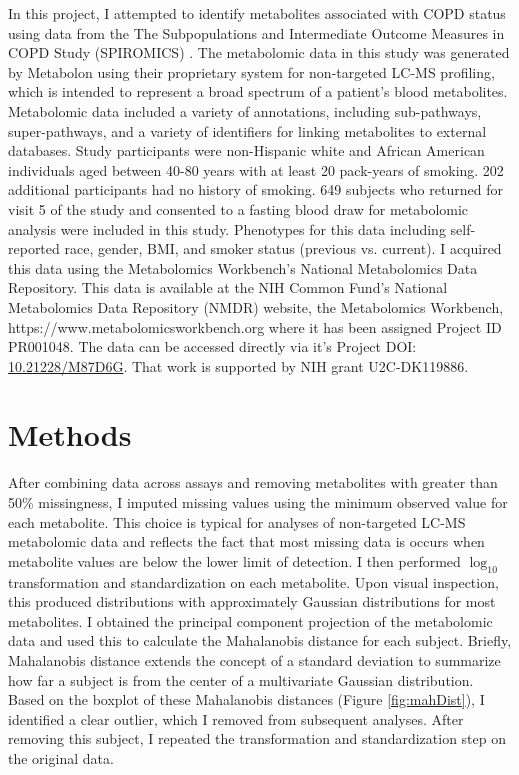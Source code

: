 \documentclass{article}
\begin{document}
In this project, I attempted to identify metabolites associated with COPD status using data from the The Subpopulations and Intermediate Outcome Measures in COPD Study (SPIROMICS) \cite{gillenwaterPlasmaMetabolomicSignatures2020}. The metabolomic data in this study was generated by Metabolon using their proprietary system for non-targeted LC-MS profiling, which is intended to represent a broad spectrum of a patient's blood metabolites. Metabolomic data included a variety of annotations, including sub-pathways, super-pathways, and a variety of identifiers for linking metabolites to external databases. Study participants were non-Hispanic white and African American individuals aged between 40-80 years with at least 20 pack-years of smoking. 202 additional participants had no history of smoking. 649 subjects who returned for visit 5 of the study and consented to a fasting blood draw for metabolomic analysis were included in this study. Phenotypes for this data including self-reported race, gender, BMI, and smoker status (previous vs. current). I acquired this data using the Metabolomics Workbench's National Metabolomics Data Repository. This data is available at the NIH Common Fund's National Metabolomics Data Repository (NMDR) website, the Metabolomics Workbench, https://www.metabolomicsworkbench.org where it has been assigned Project ID PR001048. The data can be accessed directly via it's Project DOI: \href{http://dx.doi.org/10.21228/M87D6G}{10.21228/M87D6G}. That work is supported by NIH grant U2C-DK119886.


\section*{Methods}
After combining data across assays and removing metabolites with greater than 50\% missingness, I imputed missing values using the minimum observed value for each metabolite. This choice is typical for analyses of non-targeted LC-MS metabolomic data and reflects the fact that most missing data is occurs when metabolite values are below the lower limit of detection. I then performed \(\log_{10}\) transformation and standardization on each metabolite. Upon visual inspection, this produced distributions with approximately Gaussian distributions for most metabolites. I obtained the principal component projection of the metabolomic data and used this to calculate the Mahalanobis distance for each subject. Briefly, Mahalanobis distance extends the concept of a standard deviation to summarize how far a subject is from the center of a multivariate Gaussian distribution. Based on the boxplot of these Mahalanobis distances (Figure \ref{fig:mahDist}), I identified a clear outlier, which I removed from subsequent analyses. After removing this subject, I repeated the transformation and standardization step on the original data.
\end{document}
